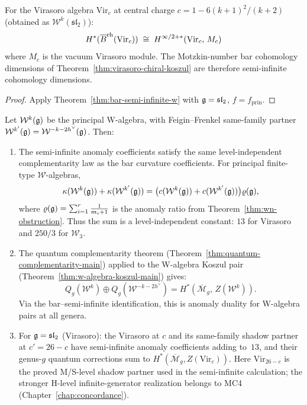 \begin{corollary}[Virasoro bar complex = semi-infinite complex;
\ClaimStatusProvedHere]
\label{cor:virasoro-semi-infinite}
For the Virasoro algebra $\mathrm{Vir}_c$ at central charge
$c = 1 - 6(k+1)^2/(k+2)$ \textup{(}obtained as
$\mathcal{W}^k(\mathfrak{sl}_2)$\textup{)}:
\[
H^*(\overline{B}^{\mathrm{ch}}(\mathrm{Vir}_c))
\;\cong\;
H^{\infty/2+*}(\mathrm{Vir}_c,\, M_c)
\]
where $M_c$ is the vacuum Virasoro module.  The Motzkin-number
bar cohomology dimensions of
Theorem~\textup{\ref{thm:virasoro-chiral-koszul}} are therefore
semi-infinite cohomology dimensions.
\end{corollary}

\begin{proof}
Apply Theorem~\ref{thm:bar-semi-infinite-w} with
$\mathfrak{g} = \mathfrak{sl}_2$, $f = f_{\mathrm{prin}}$.
\end{proof}

\begin{corollary}
\label{cor:anomaly-duality-w}
Let $\mathcal{W}^k(\mathfrak{g})$ be the principal W-algebra, with
Feigin--Frenkel same-family partner
$\mathcal{W}^{k'}(\mathfrak{g}) = \mathcal{W}^{-k-2h^\vee}(\mathfrak{g})$.
Then:
\begin{enumerate}[label=\textup{(\alph*)}]
\item The semi-infinite anomaly coefficients satisfy the same
level-independent complementarity law as the bar curvature
coefficients.  For principal finite-type $\mathcal{W}$-algebras,
\[
\kappa(\mathcal{W}^k(\mathfrak{g})) + \kappa(\mathcal{W}^{k'}(\mathfrak{g}))
= \bigl(c(\mathcal{W}^k(\mathfrak{g})) + c(\mathcal{W}^{k'}(\mathfrak{g}))\bigr)
\varrho(\mathfrak{g}),
\]
where $\varrho(\mathfrak{g}) = \sum_{i=1}^r \frac{1}{m_i+1}$ is the anomaly
ratio from Theorem~\ref{thm:wn-obstruction}.  Thus the sum is a
level-independent constant: $13$ for Virasoro and $250/3$ for
$\mathcal{W}_3$.

\item The quantum complementarity theorem
\textup{(}Theorem~\textup{\ref{thm:quantum-complementarity-main})}
applied to the W-algebra Koszul pair
\textup{(}Theorem~\textup{\ref{thm:w-algebra-koszul-main})} gives:
\[
Q_g(\mathcal{W}^k) \oplus Q_g(\mathcal{W}^{-k-2h^\vee})
= H^*(\overline{\mathcal{M}}_g,\, Z(\mathcal{W}^k)).
\]
Via the bar--semi-infinite identification, this is anomaly duality
for W-algebra pairs at all genera.

\item For $\mathfrak{g} = \mathfrak{sl}_2$
\textup{(}Virasoro\textup{)}: the Virasoro at
$c$ and its same-family shadow partner at $c' = 26 - c$ have
semi-infinite anomaly coefficients adding to~$13$, and their
genus-$g$ quantum corrections sum to
  $H^*(\overline{\mathcal{M}}_g, Z(\mathrm{Vir}_c))$.  Here
  $\mathrm{Vir}_{26-c}$ is the proved M/S-level shadow partner used in
  the semi-infinite calculation; the stronger H-level
  infinite-generator realization belongs to MC4
  (Chapter~\ref{chap:concordance}).
\end{enumerate}
\end{corollary}

